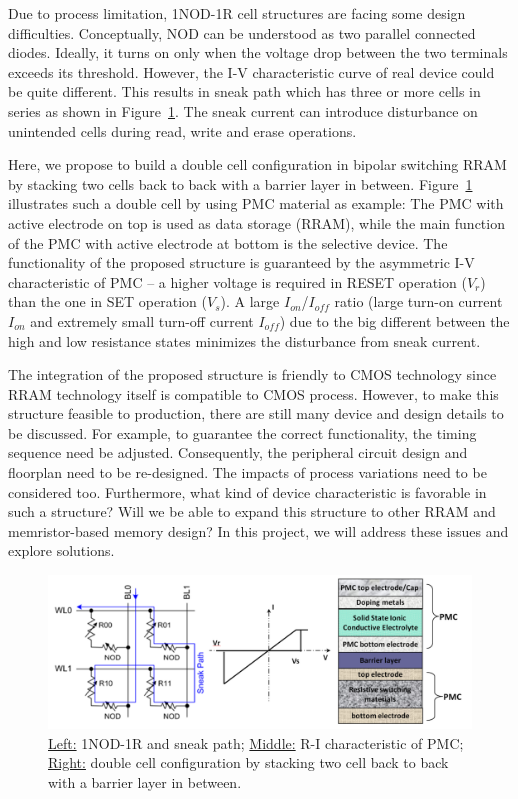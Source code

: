 Due to process limitation, 1NOD-1R cell structures are facing some design difficulties. Conceptually, NOD can be understood as two parallel connected diodes. Ideally, it turns on only when the voltage drop between the two terminals exceeds its threshold. However, the I-V characteristic curve of real device could be quite different. This results in sneak path which has three or more cells in series as shown in Figure~\ref{doublecell}. The sneak current can introduce disturbance on unintended cells during read, write and erase operations.

Here, we propose to build a double cell configuration in bipolar switching RRAM by stacking two cells back to back with a barrier layer in between. Figure~\ref{doublecell} illustrates such a double cell by using PMC material as example: The PMC with active electrode on top is used as data storage (RRAM), while the main function of the PMC with active electrode at bottom is the selective device. The functionality of the proposed structure is guaranteed by the asymmetric I-V characteristic of PMC -- a higher voltage is required in RESET operation ($V_r$) than the one in SET operation ($V_s$). A large $I_{on}$/$I_{off}$ ratio (large turn-on current $I_{on}$ and extremely small turn-off current $I_{off}$) due to the big different between the high and low resistance states minimizes the disturbance from sneak current.

The integration of the proposed structure is friendly to CMOS technology since RRAM technology itself is compatible to CMOS process. However, to make this structure feasible to production, there are still many device and design details to be discussed. For example, to guarantee the correct functionality, the timing sequence need be adjusted. Consequently, the peripheral circuit design and floorplan need to be re-designed. The impacts of process variations need to be considered too. Furthermore, what kind of device characteristic is favorable in such a structure? Will we be able to expand this structure to other RRAM and memristor-based memory design? In this project, we will address these issues and explore solutions.

\begin{figure}
\centering
\vspace{-10pt}
\includegraphics[width=0.75 \textwidth]{./figure/6_doublecell.pdf}
\vspace{-10pt}
\caption{\underline{Left:} 1NOD-1R and sneak path; \underline{Middle:} R-I characteristic of PMC; \underline{Right:} double cell configuration by stacking two cell back to back with a barrier layer in between.}
\label{doublecell}
\vspace{-10pt}
\end{figure}

